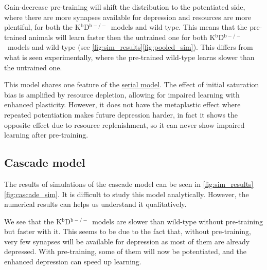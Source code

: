 \documentclass[10pt]{article}
\newcommand{\KO}{K$^\mathrm{b}$D$^{\mathrm{b}-/-}$}
\begin{document}
Gain-decrease pre-training will shift the distribution to the potentiated side, where there are more synapses available for depression and resources are more plentiful, for both the \KO\ models and wild type.
This means that the pre-trained animals will learn faster then the untrained one for both \KO\ models and wild-type (see \autoref{fig:sim_results}\ref{fig:pooled_sim}). %
This differs from what is seen experimentally, where the pre-trained wild-type learns slower than the untrained one.

This model shares one feature of the \hyperref[sec:multistate]{serial model}.
The effect of initial saturation bias is amplified by resource depletion, allowing for impaired learning with enhanced plasticity.
However, it does not have the metaplastic effect where repeated potentiation makes future depression harder, in fact it shows the opposite effect due to resource replenishment, so it can never show impaired learning after pre-training.



\subsection{Cascade model}\label{sec:cascade}

%



The results of simulations of the cascade model can be seen in
\autoref{fig:sim_results}\ref{fig:cascade_sim}. %
It is difficult to study this model analytically.
However, the numerical results can helps us understand it qualitatively.

We see that the \KO\ models are slower than wild-type without pre-training but faster with it.
This seems to be due to the fact that, without pre-training, very few synapses will be available for depression as most of them are already depressed.
With pre-training, some of them will now be potentiated,
and the enhanced depression can speed up learning.
\end{document}
